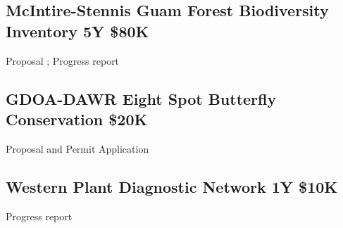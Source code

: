 \subsection{McIntire-Stennis Guam Forest Biodiversity Inventory 5Y \$80K}
\label{McIntire-Stennis Guam Forest Biodiversity Inventory}
\begin{refsection}
Proposal \cite{moore_mcintire-stennis_2018};
Progress report \cite{moore_guam_2020}
	\printbibliography[heading=none]
\end{refsection}

\subsection{GDOA-DAWR Eight Spot Butterfly Conservation \$20K}
\label{eightspot}
\begin{refsection}
Proposal and Permit Application \cite{aubrey_moore_application_2016}
\printbibliography[heading=none]
\end{refsection}

\subsection{Western Plant Diagnostic Network 1Y \$10K}
\label{WPDN}
\begin{refsection}
Progress report \cite{moore_npdn_2018}
\printbibliography[heading=none]
\end{refsection}


